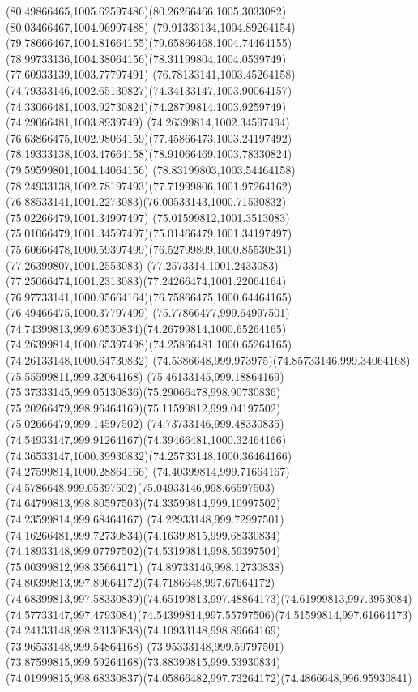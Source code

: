 {{	\curveto(80.49866465,1005.62597486)(80.26266466,1005.3033082)(80.03466467,1004.96997488)
	\curveto(79.91333134,1004.89264154)(79.78666467,1004.81664155)(79.65866468,1004.74464155)
	\curveto(78.99733136,1004.38064156)(78.31199804,1004.0539749)(77.60933139,1003.77797491)
	\curveto(76.78133141,1003.45264158)(74.79333146,1002.65130827)(74.34133147,1003.90064157)
	\curveto(74.33066481,1003.92730824)(74.28799814,1003.9259749)(74.29066481,1003.8939749)
	\curveto(74.26399814,1002.34597494)(76.63866475,1002.98064159)(77.45866473,1003.24197492)
	\curveto(78.19333138,1003.47664158)(78.91066469,1003.78330824)(79.59599801,1004.14064156)
	\curveto(78.83199803,1003.54464158)(78.24933138,1002.78197493)(77.71999806,1001.97264162)
	\curveto(76.88533141,1001.2273083)(76.00533143,1000.71530832)(75.02266479,1001.34997497)
	\curveto(75.01599812,1001.3513083)(75.01066479,1001.34597497)(75.01466479,1001.34197497)
	\curveto(75.60666478,1000.59397499)(76.52799809,1000.85530831)(77.26399807,1001.2553083)
	\curveto(77.2573314,1001.2433083)(77.25066474,1001.2313083)(77.24266474,1001.22064164)
	\curveto(76.97733141,1000.95664164)(76.75866475,1000.64464165)(76.49466475,1000.37797499)
	\curveto(75.77866477,999.64997501)(74.74399813,999.69530834)(74.26799814,1000.65264165)
	\curveto(74.26399814,1000.65397498)(74.25866481,1000.65264165)(74.26133148,1000.64730832)
	\curveto(74.5386648,999.973975)(74.85733146,999.34064168)(75.55599811,999.32064168)
	\curveto(75.46133145,999.18864169)(75.37333145,999.05130836)(75.29066478,998.90730836)
	\curveto(75.20266479,998.96464169)(75.11599812,999.04197502)(75.02666479,999.14597502)
	\curveto(74.73733146,999.48330835)(74.54933147,999.91264167)(74.39466481,1000.32464166)
	\curveto(74.36533147,1000.39930832)(74.25733148,1000.36464166)(74.27599814,1000.28864166)
	\curveto(74.40399814,999.71664167)(74.5786648,999.05397502)(75.04933146,998.66597503)
	\curveto(74.64799813,998.80597503)(74.33599814,999.10997502)(74.23599814,999.68464167)
	\curveto(74.22933148,999.72997501)(74.16266481,999.72730834)(74.16399815,999.68330834)
	\curveto(74.18933148,999.07797502)(74.53199814,998.59397504)(75.00399812,998.35664171)
	\curveto(74.89733146,998.12730838)(74.80399813,997.89664172)(74.7186648,997.67664172)
	\curveto(74.68399813,997.58330839)(74.65199813,997.48864173)(74.61999813,997.3953084)
	\curveto(74.57733147,997.4793084)(74.54399814,997.55797506)(74.51599814,997.61664173)
	\curveto(74.24133148,998.23130838)(74.10933148,998.89664169)(73.96533148,999.54864168)
	\curveto(73.95333148,999.59797501)(73.87599815,999.59264168)(73.88399815,999.53930834)
	\curveto(74.01999815,998.68330837)(74.05866482,997.73264172)(74.4866648,996.95930841)
}}
